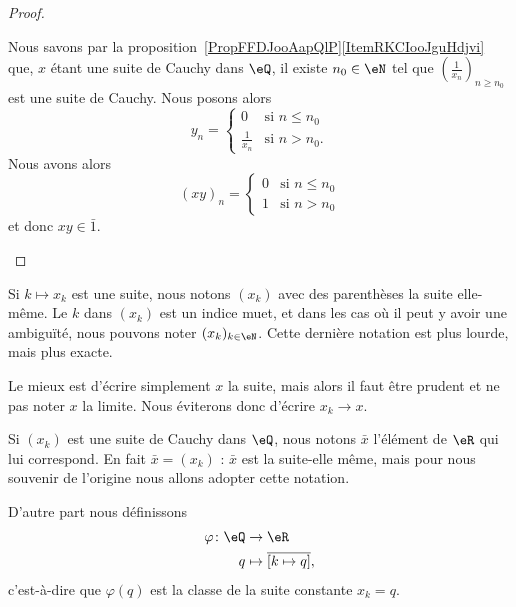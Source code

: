 \begin{proof}
\begin{subproof}
        Nous savons par la proposition~\ref{PropFFDJooAapQlP}\ref{ItemRKCIooJguHdjvi} que, \( x\) étant une suite de Cauchy dans \( \eQ\), il existe \( n_0\in \eN\) tel que \( \left( \frac{1}{ x_n } \right)_{n\geq n_0}\) est une suite de Cauchy. Nous posons alors
        \begin{equation}
            y_n=\begin{cases}
                0    &   \text{si } n\leq n_0\\
                \frac{1}{ x_n }    &    \text{si } n>n_0.
            \end{cases}
        \end{equation}
        Nous avons alors
        \begin{equation}
            (xy)_n=\begin{cases}
                0    &   \text{si } n\leq n_0\\
                1    &    \text{si } n>n_0
            \end{cases}
        \end{equation}
        et donc \( xy\in\bar 1\).
    \end{subproof}
\end{proof}

\begin{normaltext}      \label{NORMooWBYNooBQaPPk}
    Si \( k\mapsto x_k\) est une suite, nous notons \( (x_k)\) avec des parenthèses la suite elle-même. Le \( k\) dans \( (x_k)\) est un indice muet, et dans les cas où il peut y avoir une ambiguïté, nous pouvons noter \( (x_k)_{k\in \eN}\). Cette dernière notation est plus lourde, mais plus exacte.
    
    Le mieux est d'écrire simplement \( x\) la suite, mais alors il faut être prudent et ne pas noter \( x\) la limite. Nous éviterons donc d'écrire \( x_k\to x\).

    Si \( (x_k)\) est une suite de Cauchy dans \( \eQ\), nous notons \( \bar x\) l'élément de \( \eR\) qui lui correspond. En fait \( \bar x=(x_k)\) : \( \bar x\) est la suite-elle même, mais pour nous souvenir de l'origine nous allons adopter cette notation.

    D'autre part nous définissons
    \begin{equation}
        \begin{aligned}
            \varphi\colon \eQ&\to \eR \\
            q&\mapsto \overline{ [k\mapsto q]},
        \end{aligned}
    \end{equation}
    c'est-à-dire que \( \varphi(q)\) est la classe de la suite constante \( x_k=q\).
\end{normaltext}

